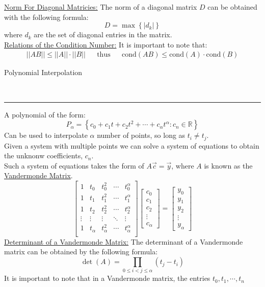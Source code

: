 \documentclass{article}
\newcommand{\header}[1]{\begin{large}\noindent #1\end{large}\\\rule{\textwidth}{0.5pt}}
\newcommand{\gap}{\medskip\\}
\begin{document}
\underline{Norm For Diagonal Matricies:} The norm of a diagonal matrix $D$ can be obtained
with the following formula:
\[
    D = \max\left\{|d_k|\right\}
\]
where $d_k$ are the set of diagonal entries in the matrix.
\gap
\underline{Relations of the Condition Number:} It is important to note that:
\begin{align*}
    ||AB|| \leq ||A||\cdot||B|| && \textrm{thus} && \textrm{cond}(AB) \leq \textrm{cond}(A) \cdot \textrm{cond}(B)
\end{align*}

\header{Polynomial Interpolation}
A polynomial of the form:
\[
    P_\alpha = \left\{ c_0 + c_1t + c_2t^2 + \cdots + c_\alpha t^\alpha : c_n \in \mathbb{R}\right\}  
\]
Can be used to interpolate $\alpha$ number of points, so long as $t_i \neq t_j$.
\gap
Given a system with multiple points we can solve a system of equations to obtain the 
unknonw coefficients, $c_n$.
\gap
Such a system of equations takes the form of $A\vec{c} = \vec{y}$, where $A$ is
known as the \underline{Vandermonde Matrix}.
\[
    \begin{bmatrix}
        1 & t_0 & t_0^2 & \cdots & t_0^\alpha\\
        1 & t_1 & t_1^2 & \cdots & t_1^\alpha\\
        1 & t_2 & t_2^2 & \cdots & t_2^\alpha\\
        \vdots & \vdots & \vdots & \ddots & \vdots\\
        1 & t_\alpha & t_\alpha^2 & \cdots & t_\alpha^\alpha\\
    \end{bmatrix}  
    \begin{bmatrix}
        c_0\\
        c_1\\
        c_2\\
        \vdots\\
        c_\alpha
    \end{bmatrix}
    =
    \begin{bmatrix}
        y_0\\
        y_1\\
        y_2\\
        \vdots\\
        y_\alpha
    \end{bmatrix}
\]
\underline{Determinant of a Vandermonde Matrix:} The determinant of a Vandermonde matrix
can be obtained by the following formula:
\[
    \det(A) = \prod_{0 \leq i < j \leq \alpha}(t_j - t_i)    
\]
It is important to note that in a Vandermonde matrix, the entries $t_0, t_1, \cdots, t_n$
\end{document}
